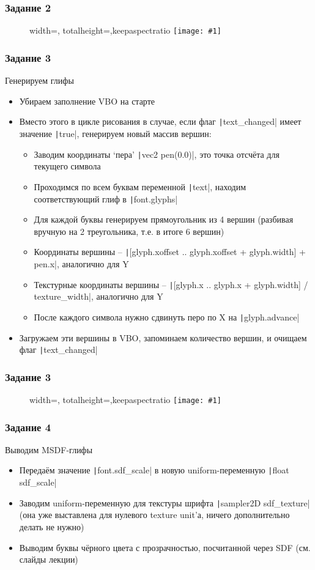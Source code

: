 \documentclass{beamer}
\newcommand{\slideimage}[1]{
  \begin{figure}
    \begin{adjustbox}{width=\textwidth, totalheight=\textheight-2\baselineskip-2\baselineskip,keepaspectratio}
      \texttt{[image: \#1]}
    \end{adjustbox}
  \end{figure}
}
\begin{document}
\begin{frame}
\frametitle{Задание 2}
\slideimage{2.png}
\end{frame}

\begin{frame}[fragile]
\frametitle{Задание 3}
\fontsize{8pt}{8pt}
\selectfont
Генерируем глифы
\begin{itemize}
\item Убираем заполнение VBO на старте
\item Вместо этого в цикле рисования в случае, если флаг \texttt|text_changed| имеет значение \texttt|true|, генерируем новый массив вершин:
\begin{itemize}
\fontsize{8pt}{8pt}
\selectfont
\item Заводим координаты `пера' \texttt|vec2 pen(0.0)|, это точка отсчёта для текущего символа
\item Проходимся по всем буквам переменной \texttt|text|, находим соответствующий глиф в \texttt|font.glyphs|
\item Для каждой буквы генерируем прямоугольник из 4 вершин (разбивая вручную на 2 треугольника, т.е. в итоге 6 вершин)
\item Координаты вершины -- \texttt|[glyph.xoffset .. glyph.xoffset + glyph.width] + pen.x|, аналогично для Y
\item Текстурные координаты вершины -- \texttt|[glyph.x .. glyph.x + glyph.width] / texture_width|, аналогично для Y
\item После каждого символа нужно сдвинуть перо по X на \texttt|glyph.advance|
\end{itemize}
\item Загружаем эти вершины в VBO, запоминаем количество вершин, и очищаем флаг \texttt|text_changed|
\end{itemize}
\end{frame}

\begin{frame}
\frametitle{Задание 3}
\slideimage{3.png}
\end{frame}

\begin{frame}[fragile]
\frametitle{Задание 4}
Выводим MSDF-глифы
\begin{itemize}
\item Передаём значение \texttt|font.sdf_scale| в новую uniform-переменную \texttt|float sdf_scale|
\item Заводим uniform-переменную для текстуры шрифта \texttt|sampler2D sdf_texture| (она уже выставлена для нулевого texture unit'а, ничего дополнительно делать не нужно)
\item Выводим буквы чёрного цвета с прозрачностью, посчитанной через SDF (см. слайды лекции)
\end{itemize}
\end{frame}
\end{document}
